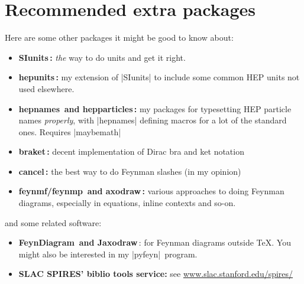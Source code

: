 \documentclass[12pt]{article}
\newcommand{\hepthesis}{\texttt{hepthesis}\xspace}
\begin{document}


\section{Recommended extra packages}
\label{sec:ExtraPackages}
Here are some other packages it might be good to know about:
\begin{itemize}
\item \textbf{SIunits\,\cite{SIunits}:} \emph{the} way to do units and get it right.
\item \textbf{hepunits\,\cite{hepunits}:} my extension of |SIunits| to include some common HEP units not used elsewhere.
\item \textbf{hepnames\,\cite{hepnames} and hepparticles\,\cite{hepparticles}:} my packages for typesetting HEP particle names \emph{properly}, with |hepnames| defining macros for a lot of the standard ones. Requires |maybemath|\,\cite{maybemath}
\item \textbf{braket\,\cite{braket}:} decent implementation of Dirac bra and ket notation
\item \textbf{cancel\,\cite{cancel}:} the best way to do Feynman slashes (in my opinion)
\item \textbf{feynmf/feynmp\,\cite{feynmf} and axodraw\,\cite{axodraw}:} various approaches to doing Feynman diagrams, especially in equations, inline contexts and so-on.
\end{itemize}
%
and some related software:
%
\begin{itemize}
\item \textbf{FeynDiagram\,\cite{feyndiagram} and Jaxodraw\,\cite{jaxodraw}}: for Feynman diagrams outside \TeX. You might also
  be interested in my |pyfeyn|\,\cite{pyfeyn} program.
\item \textbf{SLAC SPIRES' biblio tools service:} see \url{www.slac.stanford.edu/spires/}
\end{itemize}
\end{document}
